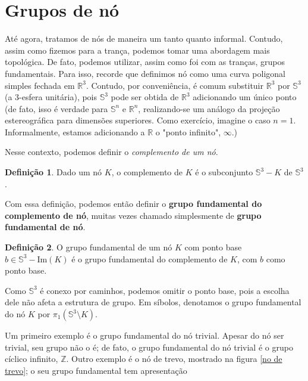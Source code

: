 \documentclass[a4paper,portuguese,11pt,twoside, leqno]{book}
\theoremstyle{definition}
\newtheorem{deff}{Definição}[section]
\begin{document}
	\section{Grupos de nó}
	\hspace{12pt} Até agora, tratamos de nós de maneira um tanto quanto informal. Contudo, assim como fizemos para a trança, podemos tomar uma abordagem mais topológica. De fato, podemos utilizar, assim como foi com as tranças, grupos fundamentais. Para isso, recorde que definimos nó como uma curva poligonal simples fechada em $\mathbb{R}^3$. Contudo, por conveniência, é comum substituir $\mathbb{R}^3$ por $\mathbb{S}^3$ (a 3-esfera unitária), pois $\mathbb{S}^3$ pode ser obtida de $\mathbb{R}^3$ adicionando um único ponto (de fato, isso é verdade para $\mathbb{S}^n$ e $\mathbb{R}^n$, realizando-se um análogo da projeção estereográfica para dimensões superiores. Como exercício, imagine o caso $n = 1$. Informalmente, estamos adicionando a $\mathbb{R}$ o "ponto infinito", $\infty$.)
	\par\vspace{0.3cm} Nesse contexto, podemos definir o \textit{complemento de um nó}.
	\begin{deff}
		\label{def complemento no}
		Dado um nó $K$, o complemento de $K$ é o subconjunto $\mathbb{S}^3 - K$ de $\mathbb{S}^3$.
	\end{deff}
	\par\vspace{0.3cm} Com essa definição, podemos então definir o \textbf{grupo fundamental do complemento de nó}, muitas vezes chamado simplesmente de \textbf{grupo fundamental de nó}.
	\begin{deff}
		\label{grupo fundamental de no}
		O grupo fundamental de um nó $K$ com ponto base $b\in\mathbb{S}^3 - \text{Im}(K)$ é o grupo fundamental do complemento de $K$, com $b$ como ponto base.
	\end{deff}
	\par\vspace{0.3cm} Como $\mathbb{S}^3$ é conexo por caminhos, podemos omitir o ponto base, pois a escolha dele não afeta a estrutura de grupo. Em síbolos, denotamos o grupo fundamental do nó $K$ por $\pi_1(\mathbb{S}^3\setminus K)$. 
	\par\vspace{0.3cm} Um primeiro exemplo é o grupo fundamental do nó trivial. Apesar do nó ser trivial, seu grupo não o é; de fato, o grupo fundamental do nó trivial é o grupo cíclico infinito, $\mathbb{Z}$. Outro exemplo é o nó de trevo, mostrado na figura \eqref{no de trevo}; o seu grupo fundamental tem apresentação 
\end{document}
